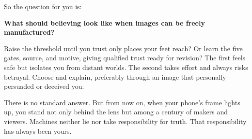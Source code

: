 So the question for you is:

\textbf{What should believing look like when images can be freely manufactured?}

Raise the threshold until you trust only places your feet reach? Or learn the five gates, source, and motive, giving qualified trust ready for revision? The first feels safe but isolates you from distant worlds. The second takes effort and always risks betrayal. Choose and explain, preferably through an image that personally persuaded or deceived you.

There is no standard answer. But from now on, when your phone's frame lights up, you stand not only behind the lens but among a century of makers and viewers. Machines neither lie nor take responsibility for truth. That responsibility has always been yours.
